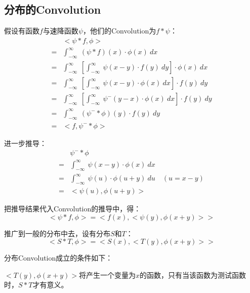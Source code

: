 \subsection{分布的Convolution}
假设有函数$f$与速降函数$\psi$，他们的Convolution为$f*\psi$：
\begin{align*}
	  & <\psi*f,\phi>                                                                                  \\
	= & \int_{-\infty}^{\infty}\ (\psi*f)(x)\cdot \phi(x)\ dx                                          \\
	= & \int_{-\infty}^{\infty}\ [\int_{-\infty}^{\infty}\ \psi(x-y)\cdot f(y)\ dy]\cdot \phi(x)\ dx   \\
	= & \int_{-\infty}^{\infty}\ [\int_{-\infty}^{\infty}\ \psi(x-y)\cdot \phi(x)\ dx]\cdot f(y)\ dy   \\
	= & \int_{-\infty}^{\infty}\ [\int_{-\infty}^{\infty}\ \psi^-(y-x)\cdot \phi(x)\ dx]\cdot f(y)\ dy \\
	= & \int_{-\infty}^{\infty}\ (\psi^-*\phi)(y)\cdot f(y)\ dy                                        \\
	= & <f,\psi^-*\phi>
\end{align*}

进一步推导：
\begin{align*}
	  & \psi^-*\phi                                                       \\
	= & \int_{-\infty}^{\infty}\ \psi(x-y)\cdot \phi(x)\ dx               \\
	= & \int_{-\infty}^{\infty}\ \psi(u)\cdot \phi(u+y)\ du \quad (u=x-y) \\
	= & <\psi(u),\phi(u+y)>
\end{align*}

把推导结果代入Convolution的推导中，得：
$$
	<\psi*f,\phi>=<f(x),<\psi(y),\phi(x+y)>>
$$

推广到一般的分布中去，设有分布$S$和$T$：
\begin{equation}
	<S*T,\phi>=<S(x),<T(y),\phi(x+y)>>
\end{equation}

分布Convolution成立的条件如下：

$<T(y),\phi(x+y)>$将产生一个变量为$x$的函数，只有当该函数为测试函数时，$S*T$才有意义。
